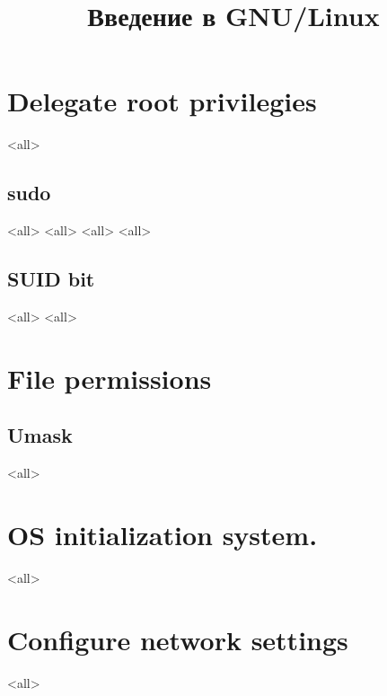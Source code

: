 

\title{Введение в GNU/Linux}





\begin{frame}
	\frametitle{}
	\titlepage
	\vspace{-0.5cm}
	\begin{center}
	\end{center}
\end{frame}



\section{Delegate root privilegies}
\mode<all>{}
\subsection{sudo}
\mode<all>{}
\mode<all>{}
\mode<all>{}
\mode<all>{}
\subsection{SUID bit}
\mode<all>{}
\mode<all>{}
\section{File permissions}
\subsection{Umask}
\mode<all>{}
\section{OS initialization system.}
\mode<all>{}


\section{Configure network settings}
\mode<all>{}


